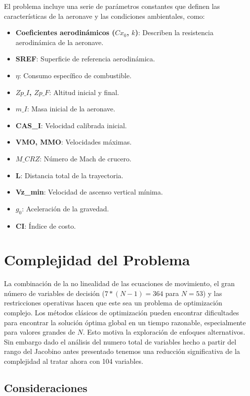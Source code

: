 \documentclass[fleqn]{article}
\begin{document}
El problema incluye una serie de parámetros constantes que definen las características de la aeronave y las condiciones ambientales, como:

\begin{itemize}
    \item \textbf{Coeficientes aerodinámicos ($Cx_0$, $k$)}:  Describen la resistencia aerodinámica de la aeronave.
    \item \textbf{SREF}: Superficie de referencia aerodinámica.
    \item \textbf{$\eta$}: Consumo específico de combustible.
    \item \textbf{$Zp\_I$, $Zp\_F$}: Altitud inicial y final.
    \item \textbf{$m\_I$}: Masa inicial de la aeronave.
    \item \textbf{CAS\_I}: Velocidad calibrada inicial.
    \item \textbf{VMO, MMO}: Velocidades máximas.
    \item \textbf{$M\_CRZ$}: Número de Mach de crucero.
    \item \textbf{L}: Distancia total de la trayectoria.
    \item \textbf{Vz\_min}: Velocidad de ascenso vertical mínima.
    \item \textbf{$g_0$}: Aceleración de la gravedad.
    \item \textbf{CI}: Índice de costo.
\end{itemize}

\section{Complejidad del Problema}

La combinación de la no linealidad de las ecuaciones de movimiento, el gran número de variables de decisión ($7*(N-1) = 364$ para $N=53$) y las restricciones operativas hacen que este sea un problema de optimización complejo.  Los métodos clásicos de optimización pueden encontrar dificultades para encontrar la solución óptima global en un tiempo razonable, especialmente para valores grandes de $N$.  Esto motiva la exploración de enfoques alternativos. Sin embargo dado el análisis del numero total de variables hecho a partir del rango del Jacobino antes presentado tenemos una reducción significativa de la complejidad al tratar ahora con 104 variables.

\subsection*{Consideraciones}
\end{document}
